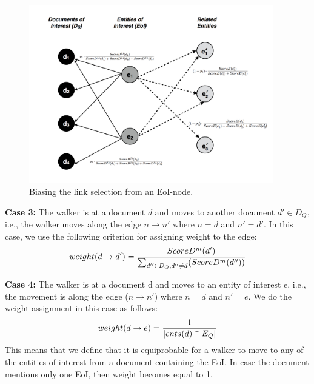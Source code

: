 \documentclass{article}
\begin{document}
\begin{figure}[ht]
\begin{mdframed}
	\centering
	\includegraphics[width=0.95\textwidth]{eoi_weighting}
\end{mdframed}
	\caption{Biasing the link selection from an EoI-node.}
	\label{fig:eoi_weighting}
\end{figure}


\vspace{2mm}\noindent
{\bf Case 3:} The walker is at a document $d$ and moves to another document $d' \in D_Q$, i.e., the walker moves along the edge $n \rightarrow n'$ where $n=d$ and $n'=d'$. 
In this case, we use the following criterion for assigning weight to the edge:
\begin{equation}
\begin{split}
\small
weight(d \rightarrow d') = \frac{ScoreD^{m}(d')}{\sum_{d'' \in D_Q , d'' \neq d}(ScoreD^{m}(d''))}
\end{split}
\end{equation}

\vspace{2mm}\noindent
{\bf Case 4:} The walker is at a document d and moves to an entity of interest e, i.e., 
the movement is along the edge ($n \rightarrow n'$) where $n=d$ and $n'=e$. We do the 
weight assignment in this case as follows:
\begin{equation}
\begin{split}
\small
weight(d \rightarrow e) = \frac{1}{|ents(d) \cap E_Q|}
\end{split}
\end{equation}
This means that we define that it is equiprobable for a walker to move to any of the entities of interest from a document containing the EoI. In case the document mentions 
only one EoI, then weight becomes equal to 1.
\end{document}
